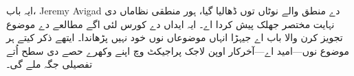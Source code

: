 \documentclass[../../../include/open-logic-chapter]{subfiles}
\begin{document}

\begin{editorial}
  ایہ باب، Jeremy Avigad دے منطق والے نوٹاں توں ڈھالیا گیا،
  ہور منطقی نظاماں دی نہایت مختصر جھلک پیش کردا اے۔ ایہ
  ایداں دے کورس لئی اگے مطالعے دے موضوع تجویز کرن والا باب
  اے جیہڑا انہاں موضوعاں نوں خود نہیں پڑھاندا۔ ایتھے ذکر
  کیتے ہر موضوع نوں---امید اے---آخرکار اوپن لاجک پراجیکٹ
  وچ اپنے وکھرے حصے دی سطح اُتے تفصیلی جگہ ملے گی۔
\end{editorial}








\OLEndChapterHook
\end{document}
